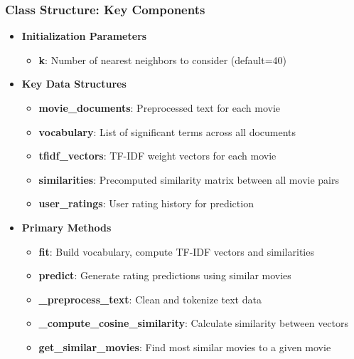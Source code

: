 \documentclass{beamer}
\begin{document}
\begin{frame}
\frametitle{Class Structure: Key Components}

\begin{itemize}
    \item \textbf{Initialization Parameters}
    \begin{itemize}
        \item \textbf{k}: Number of nearest neighbors to consider (default=40)
    \end{itemize}
    
    \item \textbf{Key Data Structures}
    \begin{itemize}
        \item \textbf{movie\_documents}: Preprocessed text for each movie
        \item \textbf{vocabulary}: List of significant terms across all documents
        \item \textbf{tfidf\_vectors}: TF-IDF weight vectors for each movie
        \item \textbf{similarities}: Precomputed similarity matrix between all movie pairs
        \item \textbf{user\_ratings}: User rating history for prediction
    \end{itemize}
    
    \item \textbf{Primary Methods}
    \begin{itemize}
        \item \textbf{fit}: Build vocabulary, compute TF-IDF vectors and similarities
        \item \textbf{predict}: Generate rating predictions using similar movies
        \item \textbf{\_preprocess\_text}: Clean and tokenize text data
        \item \textbf{\_compute\_cosine\_similarity}: Calculate similarity between vectors
        \item \textbf{get\_similar\_movies}: Find most similar movies to a given movie
    \end{itemize}
\end{itemize}
\end{frame}
\end{document}
